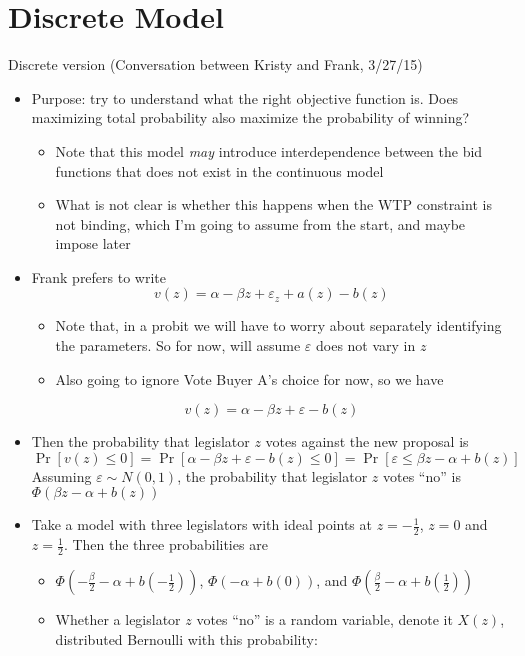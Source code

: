 \documentclass[12pt]{article}
\newcommand{\ve}{\varepsilon}
\begin{document}
\section{Discrete Model}
Discrete version (Conversation between Kristy and Frank, 3/27/15)
\begin{itemize}
	\item Purpose: try to understand what the right objective function is. Does maximizing total probability also maximize the probability of winning?
		\begin{itemize}
			\item Note that this model \textit{may} introduce interdependence between the bid functions that does not exist in the continuous model
			\item What is not clear is whether this happens when the WTP constraint is not binding, which I'm going to assume from the start, and maybe impose later
		\end{itemize}
	\item Frank prefers to write
	  \[
		  v(z) = \alpha -\beta z + \ve_z + a(z) - b(z)
		\]
			\begin{itemize}
				\item Note that, in a probit we will have to worry about separately identifying the parameters. So for now, will assume $\ve$ does not vary in $z$
				\item Also going to ignore Vote Buyer A's choice for now, so we have
			\end{itemize}
	  \[
		  v(z) = \alpha -\beta z + \ve - b(z)
		\]
	\item Then the probability that legislator $z$ votes against the new proposal is
	  \[
		  \Pr\left[v(z)\leq 0 \right] = \Pr\left[\alpha -\beta z + \ve - b(z) \leq 0 \right] 
			                            = \Pr\left[\ve \leq \beta z - \alpha + b(z) \right] 
		\]
		Assuming $\ve \sim N(0,1)$, the probability that legislator $z$ votes ``no'' is $\Phi\left(\beta z - \alpha + b(z) \right)$
	\item Take a model with three legislators with ideal points at $z=-\frac{1}{2}$, $z=0$ and $z=\frac{1}{2}$. Then the three probabilities are
		\begin{itemize}
			\item $\Phi\left(-\frac{\beta}{2} - \alpha + b(-\frac{1}{2}) \right)$, $\Phi\left(- \alpha + b(0) \right)$, and $\Phi\left(\frac{\beta}{2} - \alpha + b(\frac{1}{2}) \right)$
			\item Whether a legislator $z$ votes ``no'' is a random variable, denote it $X(z)$, distributed Bernoulli with this probability:

\end{itemize}
\end{itemize}
\end{document}
